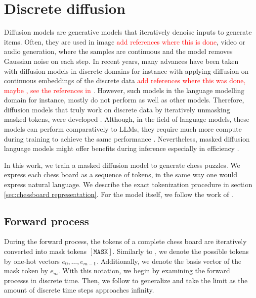 \section{Discrete diffusion}
\label{sec:discrete diffusion}

Diffusion models are generative models that iteratively denoise inputs to generate items. Often, they are used in image \textcolor{red}{add references where this is done}, video or audio generation, where the samples are continuous and the model removes Gaussian noise on each step. In recent years, many advances have been taken with diffusion models in discrete domains for instance with applying diffusion on continuous embeddings of the discrete data \textcolor{red}{add references where this was done, maybe \cite{li2022diffusionlmimprovescontrollabletext}, see the references in \cite{shi2025simplifiedgeneralizedmaskeddiffusion}}. However, such models in the language modelling domain for instance, mostly do not perform as well as other models. Therefore, diffusion models that truly work on discrete data by iteratively unmasking masked tokens, were developed \cite{austin2021structureddenoisingdiffusionmodels}. Although, in the field of language models, these models can perform comparatively to LLMs, they require much more compute during training to achieve the same performance \cite{nie2025scalingmaskeddiffusionmodels}. Nevertheless, masked diffusion language models might offer benefits during inference especially in efficiency \cite{nie2025scalingmaskeddiffusionmodels}.

In this work, we train a masked diffusion model to generate chess puzzles. We express each chess board as a sequence of tokens, in the same way one would express natural language. We describe the exact tokenization procedure in section \ref{sec:chessboard representation}. For the model itself, we follow the work of \cite{shi2025simplifiedgeneralizedmaskeddiffusion}.


\subsection{Forward process}

During the forward process, the tokens of a complete chess board are iteratively converted into mask tokens $[\mathtt{MASK}]$. Similarly to \cite{shi2025simplifiedgeneralizedmaskeddiffusion}, we denote the possible tokens by one-hot vectors $e_0, \dots, e_{m - 1}$. Additionally, we denote the basis vector of the mask token by $e_m$. With this notation, we begin by examining the forward processs in discrete time. Then, we follow \cite{shi2025simplifiedgeneralizedmaskeddiffusion} to generalize and take the limit as the amount of discrete time steps approaches infinity.

